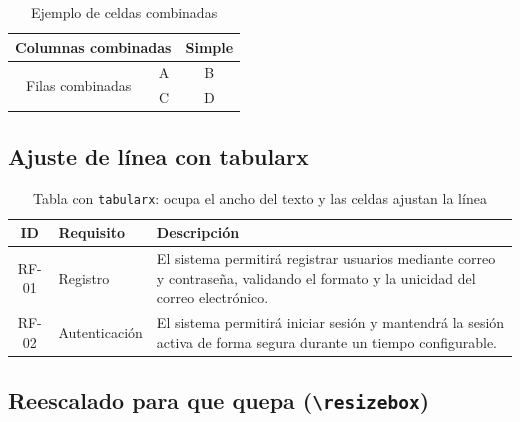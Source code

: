\begin{table}[H]
  \centering
  \begin{tabular}{|c|c|c|}
    \hline
    \multicolumn{2}{|c|}{Columnas combinadas} & Simple \\ \hline
    \multirow{2}{*}{Filas combinadas} & A & B \\ \cline{2-3}
                                      & C & D \\ \hline
  \end{tabular}
  \caption{Ejemplo de celdas combinadas}
  \label{tab:example-merged}
\end{table}

\subsection{Ajuste de línea con tabularx}

\begin{table}[H]
  \centering
  \begin{tabularx}{\textwidth}{|c|l|X|}
    \hline
    \textbf{ID} & \textbf{Requisito} & \textbf{Descripción} \\ \hline
    RF-01 & Registro & El sistema permitirá registrar usuarios mediante correo y contraseña, validando el formato y la unicidad del correo electrónico. \\ \hline
    RF-02 & Autenticación & El sistema permitirá iniciar sesión y mantendrá la sesión activa de forma segura durante un tiempo configurable. \\ \hline
  \end{tabularx}
  \caption{Tabla con \texttt{tabularx}: ocupa el ancho del texto y las celdas ajustan la línea}
  \label{tab:tabularx}
\end{table}

\subsection{Reescalado para que quepa (\texttt{\textbackslash resizebox})}

